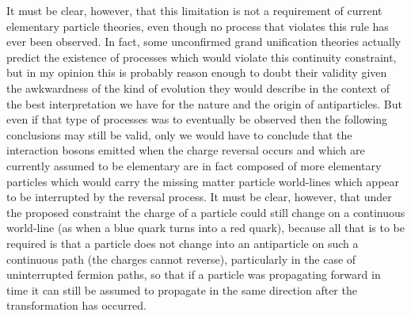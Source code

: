 \documentclass[notitlepage,12pt]{report}
\begin{document}
It must be clear, however, that this limitation is not a requirement of current elementary particle theories, even though no process that violates this rule has ever been observed. In fact, some unconfirmed grand unification theories actually predict the existence of processes which would violate this continuity constraint, but in my opinion this is probably reason enough to doubt their validity given the awkwardness of the kind of evolution they would describe in the context of the best interpretation we have for the nature and the origin of antiparticles. But even if that type of processes was to eventually be observed then the following conclusions may still be valid, only we would have to conclude that the interaction bosons emitted when the charge reversal occurs and which are currently assumed to be elementary are in fact composed of more elementary particles which would carry the missing matter particle world-lines which appear to be interrupted by the reversal process. It must be clear, however, that under the proposed constraint the charge of a particle could still change on a continuous world-line (as when a blue quark turns into a red quark), because all that is to be required is that a particle does not change into an antiparticle on such a continuous path (the charges cannot reverse), particularly in the case of uninterrupted fermion paths, so that if a particle was propagating forward in time it can still be assumed to propagate in the same direction after the transformation has occurred.
\end{document}
